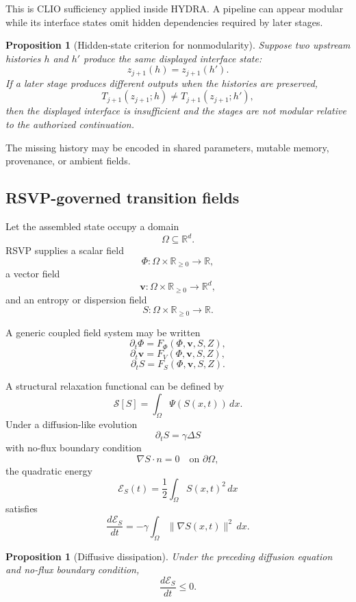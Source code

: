 \documentclass[11pt]{article}
\newtheorem{proposition}[definition]{Proposition}
\theoremstyle{definition}
\newcommand{\R}{\mathbb{R}}
\newcommand{\FieldPhi}{\Phi}
\newcommand{\FieldV}{\mathbf{v}}
\newcommand{\FieldS}{S}
\begin{document}
This is CLIO sufficiency applied inside HYDRA. A pipeline can appear modular while its interface states omit hidden dependencies required by later stages.

\begin{proposition}[Hidden-state criterion for nonmodularity]
Suppose two upstream histories \(h\) and \(h'\) produce the same displayed interface state:
\[
z_{j+1}(h)=z_{j+1}(h').
\]
If a later stage produces different outputs when the histories are preserved,
\[
T_{j+1}(z_{j+1};h)
\neq
T_{j+1}(z_{j+1};h'),
\]
then the displayed interface is insufficient and the stages are not modular relative to the authorized continuation.
\end{proposition}

The missing history may be encoded in shared parameters, mutable memory, provenance, or ambient fields.

\subsection{RSVP-governed transition fields}

Let the assembled state occupy a domain
\[
\Omega\subseteq\R^d.
\]
RSVP supplies a scalar field
\[
\FieldPhi:\Omega\times\R_{\geq0}\to\R,
\]
a vector field
\[
\FieldV:\Omega\times\R_{\geq0}\to\R^d,
\]
and an entropy or dispersion field
\[
\FieldS:\Omega\times\R_{\geq0}\to\R.
\]

A generic coupled field system may be written
\[
\partial_t\FieldPhi
=
F_\Phi
\left(
\FieldPhi,
\FieldV,
\FieldS,
Z
\right),
\]
\[
\partial_t\FieldV
=
F_V
\left(
\FieldPhi,
\FieldV,
\FieldS,
Z
\right),
\]
\[
\partial_t\FieldS
=
F_S
\left(
\FieldPhi,
\FieldV,
\FieldS,
Z
\right).
\]

A structural relaxation functional can be defined by
\[
\mathscr S[\FieldS]
=
\int_\Omega
\Psi(\FieldS(x,t))
\,dx.
\]
Under a diffusion-like evolution
\[
\partial_t\FieldS
=
\gamma\Delta\FieldS
\]
with no-flux boundary condition
\[
\nabla\FieldS\cdot n=0
\quad
\text{on }\partial\Omega,
\]
the quadratic energy
\[
\mathscr E_S(t)
=
\frac12
\int_\Omega
\FieldS(x,t)^2
\,dx
\]
satisfies
\[
\frac{d\mathscr E_S}{dt}
=
-\gamma
\int_\Omega
\|\nabla\FieldS(x,t)\|^2
\,dx.
\]

\begin{proposition}[Diffusive dissipation]
Under the preceding diffusion equation and no-flux boundary condition,
\[
\frac{d\mathscr E_S}{dt}
\leq0.
\]
\end{proposition}
\end{document}

